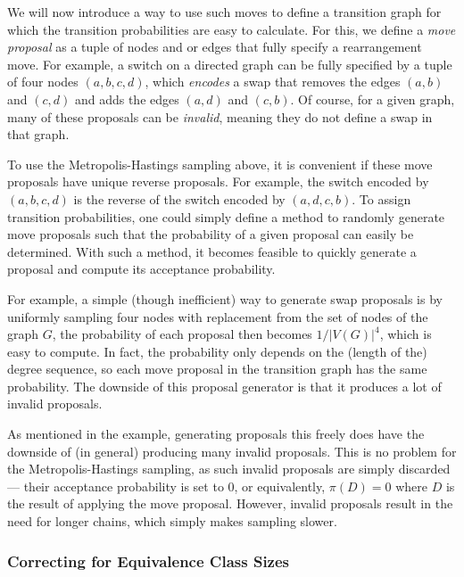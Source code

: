 \documentclass{article}
\theoremstyle{definition}
\begin{document}
We will now introduce a way to use such moves to define a transition graph for which the transition probabilities are easy to calculate. For this, we define a \textit{move proposal} as a tuple of nodes and or edges that fully specify a rearrangement move. For example, a switch on a directed graph can be fully specified by a tuple of four nodes $(a,b,c,d)$, which \textit{encodes} a swap that removes the edges $(a,b)$ and $(c,d)$ and adds the edges $(a,d)$ and $(c,b)$. Of course, for a given graph, many of these proposals can be \textit{invalid}, meaning they do not define a swap in that graph. 

To use the Metropolis-Hastings sampling above, it is convenient if these move proposals have unique reverse proposals. For example, the switch encoded by $(a,b,c,d)$ is the reverse of the switch encoded by $(a,d,c,b)$. To assign transition probabilities, one could simply define a method to randomly generate move proposals such that the probability of a given proposal can easily be determined. With such a method, it becomes feasible to quickly generate a proposal and compute its acceptance probability.

For example, a simple (though inefficient) way to generate swap proposals is by uniformly sampling four nodes with replacement from the set of nodes of the graph $G$, the probability of each proposal then becomes $1/|V(G)|^4$, which is easy to compute. In fact, the probability only depends on the (length of the) degree sequence, so each move proposal in the transition graph has the same probability. The downside of this proposal generator is that it produces a lot of invalid proposals.

As mentioned in the example, generating proposals this freely does have the downside of (in general) producing many invalid proposals. This is no problem for the Metropolis-Hastings sampling, as such invalid proposals are simply discarded --- their acceptance probability is set to $0$, or equivalently, $\pi(D)=0$ where $D$ is the result of applying the move proposal. However, invalid proposals result in the need for longer chains, which simply makes sampling slower.



\subsubsection{Correcting for Equivalence Class Sizes}\label{sec:correction_representations}
\end{document}
